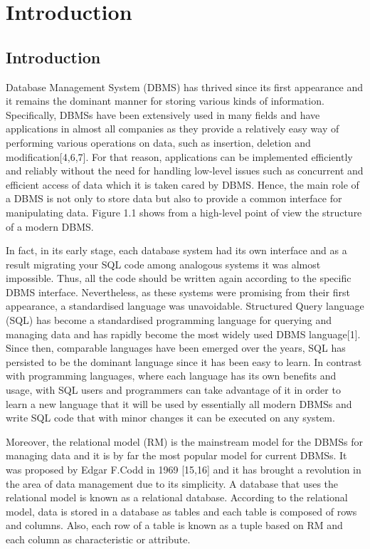 \chapter{Introduction}
 \section{Introduction}


Database Management System (DBMS) has thrived since its first appearance and it remains the dominant manner for storing various kinds of information. Specifically, DBMSs have been extensively used in many fields and have applications in almost all companies as they provide a relatively easy way of performing various operations on data, such as insertion, deletion and modification[4,6,7]. For that reason, applications can be implemented efficiently and reliably without the need for handling low-level issues such as concurrent and efficient access of data which it is taken cared by DBMS. Hence, the main role of a DBMS is not only to store data but also to provide a common interface for manipulating data. Figure 1.1 shows from a high-level point of view the structure of a modern DBMS.

In fact, in its early stage, each database system had its own interface and as a result migrating your SQL code among analogous systems it was almost impossible. Thus, all the code should be written again according to the specific DBMS interface. Nevertheless, as these systems were promising from their first appearance, a standardised language was unavoidable. Structured Query language (SQL) has become a standardised programming language for querying and managing data and has rapidly become the most widely used DBMS language[1].  Since then, comparable languages have been emerged over the years, SQL has persisted to be the dominant language since it has been easy to learn. In contrast with programming languages, where each language has its own benefits and usage, with SQL users and programmers can take advantage of it in order to learn a new language that it will be used by essentially all modern DBMSs and write SQL code that with minor changes it can be executed on any system. 

Moreover, the relational model (RM) is the mainstream model for the DBMSs for managing data and it is by far the most popular model for current DBMSs. It was proposed by Edgar F.Codd in 1969 [15,16] and it has brought a revolution in the area of data management due to its simplicity. A database that uses the relational model is known as a relational database. According to the relational model, data is stored in a database as tables and each table is composed of rows and columns. Also, each row of a table is known as a tuple based on RM and each column as characteristic or attribute. 

